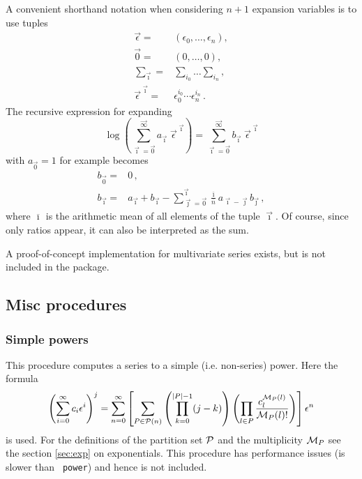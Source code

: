 \documentclass[titlepage]{article}
\begin{document}
A convenient shorthand notation when considering $n+1$ expansion variables is to
use tuples
\begin{align}
\label{eq:multivar_conv}
\vec{\epsilon}=&(\epsilon_0,\dots,\epsilon_n), \\
\vec{0}=&(0,\dots,0), \\
\sum_{\vec{\imath}}=&\sum_{i_0}\dots\sum_{i_n}, \\
\vec{\epsilon}^{\;\vec{\imath}} =& \epsilon_0^{i_0 }\cdots\epsilon_n^{i_n}\,.
\end{align}
The recursive expression for expanding
\begin{equation}
  \label{eq:log_multivar}
\log\left(\sum_{\vec{\imath}=\vec{0}}^{\vec{\infty}}a_{\vec{\imath}}\;
 \vec{\epsilon}^{\;\vec{\imath}}\right)=\sum_{\vec{\imath}=\vec{0}}^{\vec{\infty}} b_{\vec{\imath}}\;\vec{\epsilon}^{\;\vec{\imath}}
 \end{equation}
with $a_{\vec{0}}=1$ for example becomes
\begin{align}
  \label{eq:rec_log_multivar}
  b_{\vec{0}}=&0\,,\\
b_{\vec{\imath}}=&a_{\vec{\imath}}+b_{\vec{\imath}}-\sum_{\vec{\jmath}=\vec{0}}^{\vec{\imath}}
\frac{\overline{\imath}}{\overline{n}} a_{\vec{\imath}-\vec{\jmath}} b_{\vec{\jmath}}\,,
 \end{align}
where $\overline{\imath}$ is the arithmetic mean of all elements of the tuple
$\vec{\imath}$. Of course, since only ratios appear, it can also be
interpreted as the sum.

A proof-of-concept implementation for multivariate series exists, but is
not included in the package.

\subsection{Misc procedures}
\label{sec:proc_depr}

\subsubsection{Simple powers}
\label{sec:impl_simpl_pow}

This procedure computes a series to a simple
(i.e. non-series) power. Here the formula
\begin{equation}
  \label{eq:simpl_pow}
  \left(\sum_{i=0}^{\infty}c_i \epsilon^i\right)^j = \sum_{n=0}^\infty
  \left[\sum_{P \in {\cal P}(n)}\left(\prod_{k=0}^{|P|-1}
    (j-k)\right)\left(\prod_{l \in P} \frac{c^{{\cal M}_P(l)}_l}{{\cal M}_P(l)!} \right)\right]\epsilon^n
\end{equation}
is used. For the definitions of the partition set ${\cal P}$ and the
multiplicity ${\cal M}_P$ see the section \ref{sec:exp} on
exponentials. This procedure has performance issues (is slower than {\tt
  power}) and hence is not included.
\end{document}
